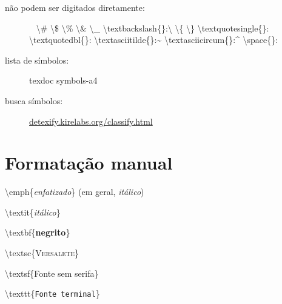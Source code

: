 \documentclass[10pt,twoside,english,brazilian]{article}
\begin{document}
\begin{multicols}{3}
\vspace{\baselineskip}

\begin{description}
  \item[não podem ser digitados diretamente:]~\vspace{5pt}\newline
    \textbackslash\#
    \quad\textbackslash\$
    \quad\textbackslash\%
    \quad\textbackslash\&
    \quad\textbackslash\_
    \quad\textbackslash{}textbackslash\{\}:\enspace\textbackslash
    \vspace{3pt}\newline
    \textbackslash\{
    \quad\textbackslash\}
    \quad\textbackslash{}textquotesingle\{\}:\enspace\textquotesingle
    \quad\textbackslash{}textquotedbl\{\}:\enspace\textquotedbl
    \vspace{3pt}\newline
    \textbackslash{}textasciitilde\{\}:\enspace\textasciitilde
    \quad\textbackslash{}textasciicircum\{\}:\enspace\textasciicircum
    \quad\raisebox{-.1\baselineskip}{\`\space}%
        \hspace{.12em}\textbackslash{}space\{\}:
        \enspace\raisebox{-.1\baselineskip}{\`\space}
\end{description}


\vspace{\baselineskip}


\begin{description}
  \item[lista de símbolos:] \textsf{texdoc symbols-a4}
  \item[busca símbolos:] \url{detexify.kirelabs.org/classify.html}
\end{description}

\section*{Formatação manual}

\textbackslash{}emph\{\emph{enfatizado}\} (em geral, \textit{itálico})

\textbackslash{}textit\{\textit{itálico}\}

\textbackslash{}textbf\{\textbf{negrito}\}

\textbackslash{}textsc\{\textsc{Versalete}\}

\textbackslash{}textsf\{\textsf{Fonte sem serifa}\}

\textbackslash{}texttt\{\texttt{Fonte terminal}\}


\end{multicols}
\end{document}
